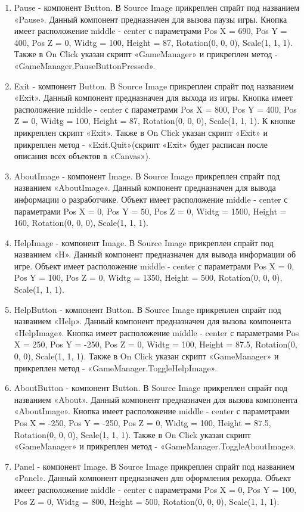 \documentclass[14pt, oneside]{altsu-report}
\begin{document}
\begin{enumerate}
\item Pause - компонент Button. В Source Image прикреплен спрайт под названием «Pause». Данный компонент предназначен для вызова паузы игры. Кнопка имеет расположение middle - center с параметрами Pos X = 690, Pos Y = 400, Pos Z = 0, Widtg = 100, Height = 87, Rotation(0, 0, 0), Scale(1, 1, 1). Также в On Click указан скрипт «GameManager» и прикреплен метод - «GameManager.PauseButtonPressed».
\item Exit - компонент Button. В Source Image прикреплен спрайт под названием «Exit». Данный компонент предназначен для выхода из игры. Кнопка имеет расположение middle - center с параметрами Pos X = 800, Pos Y = 400, Pos Z = 0, Widtg = 100, Height = 87, Rotation(0, 0, 0), Scale(1, 1, 1). К кнопке прикреплен скрипт «Exit». Также в On Click указан скрипт «Exit» и прикреплен метод - «Exit.Quit»(скрипт «Exit» будет расписан после описания всех объектов в «Canvas»). 
\item AboutImage - компонент Image. В Source Image прикреплен спрайт под названием «AboutImage». Данный компонент предназначен для вывода информации о разработчике. Объект имеет расположение middle - center с параметрами Pos X = 0, Pos Y = 50, Pos Z = 0, Widtg = 1500, Height = 160, Rotation(0, 0, 0), Scale(1, 1, 1). 
\item HelpImage - компонент Image. В Source Image прикреплен спрайт под названием «H». Данный компонент предназначен для вывода информации об игре. Объект имеет расположение middle - center с параметрами Pos X = 0, Pos Y = 100, Pos Z = 0, Widtg = 1350, Height = 500, Rotation(0, 0, 0), Scale(1, 1, 1). 
\item HelpButton - компонент Button. В Source Image прикреплен спрайт под названием «Help». Данный компонент предназначен для вызова компонента «HelpImage». Кнопка имеет расположение middle - center с параметрами Pos X = 250, Pos Y = -250, Pos Z = 0, Widtg = 100, Height = 87.5, Rotation(0, 0, 0), Scale(1, 1, 1). Также в On Click указан скрипт «GameManager» и прикреплен метод - «GameManager.ToggleHelpImage».
\item AboutButton - компонент Button. В Source Image прикреплен спрайт под названием «About». Данный компонент предназначен для вызова компонента «AboutImage». Кнопка имеет расположение middle - center с параметрами Pos X = -250, Pos Y = -250, Pos Z = 0, Widtg = 100, Height = 87.5, Rotation(0, 0, 0), Scale(1, 1, 1). Также в On Click указан скрипт «GameManager» и прикреплен метод - «GameManager.ToggleAboutImage».
\item Panel - компонент Image. В Source Image прикреплен спрайт под названием «Panel». Данный компонент предназначен для оформления рекорда. Объект имеет расположение middle - center с параметрами Pos X = 0, Pos Y = 100, Pos Z = 0, Widtg = 800, Height = 500, Rotation(0, 0, 0), Scale(1, 1, 1). 

\end{enumerate}
\end{document}
